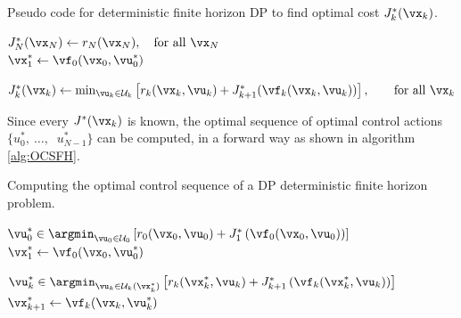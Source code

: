 \begin{algorithm}
  \caption{Pseudo code for deterministic finite horizon DP to find optimal cost $J_k^*(\vx_k)$.}\label{alg:DPJs}

$J^*_N(\vx_N) \gets r_N(\vx_N), \quad \text{for all } \vx_N$ \\
$\vx_1^* \gets \vf_0(\vx_0,\vu_0^*)$ 

{
  $J^*_k(\vx_k) \gets \min_{\vu_k \in \mathcal{U}_k} \left[ r_k(\vx_k, \vu_k) + J^*_{k+1} (\vf_k(\vx_k,\vu_k))  \right], \qquad \text{for all } \vx_k$
}
\end{algorithm}


Since every $J^*(\vx_k)$ is known, the optimal sequence  of optimal control actions $\{u^*_0,\ \dots,\ $ $u^*_{N-1}\}$ can be computed, in a forward way as shown in algorithm \ref{alg:OCSFH}.

\begin{algorithm}
\caption{Computing the optimal control sequence of a DP deterministic finite horizon problem.}\label{alg:OCSFH}

$\vu_0^* \in \argmin_{\vu_0 \in \mathcal{U}_0} \left[ r_0(\vx_0,\vu_0) + J_1^*\left(\vf_0(\vx_0,\vu_0)\right) \right]$ \\
$\vx_1^* \gets \vf_0(\vx_0,\vu_0^*)$

{
  $\vu_k^* \in \argmin_{\vu_k \in \mathcal{U}_k(\vx_k^*)} \left[ r_k(\vx_k^*,\vu_k) + J_{k+1}^*\left(\vf_k(\vx_k^*,\vu_k)\right) \right]$
  $\vx_{k+1}^* \gets \vf_k(\vx_k,\vu_k^*)$
}
\end{algorithm}

%


